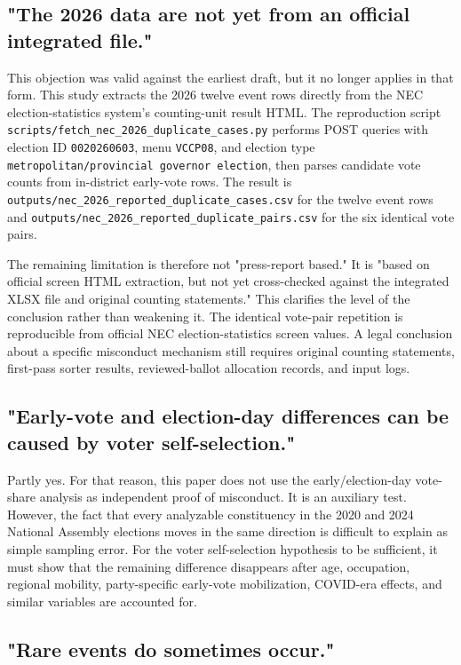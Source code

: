 \documentclass[preprint]{../ieie/IEIE}
\begin{document}
\subsection{"The 2026 data are not yet from an official integrated file."}

This objection was valid against the earliest draft, but it no longer applies in that form. This study extracts the 2026 twelve event rows directly from the NEC election-statistics system's counting-unit result HTML. The reproduction script \texttt{scripts/fetch\_nec\_2026\_duplicate\_cases.py} performs POST queries with election ID \texttt{0020260603}, menu \texttt{VCCP08}, and election type \texttt{metropolitan/provincial governor election}, then parses candidate vote counts from in-district early-vote rows. The result is \texttt{outputs/nec\_2026\_reported\_duplicate\_cases.csv} for the twelve event rows and \texttt{outputs/nec\_2026\_reported\_duplicate\_pairs.csv} for the six identical vote pairs.

The remaining limitation is therefore not "press-report based." It is "based on official screen HTML extraction, but not yet cross-checked against the integrated XLSX file and original counting statements." This clarifies the level of the conclusion rather than weakening it. The identical vote-pair repetition is reproducible from official NEC election-statistics screen values. A legal conclusion about a specific misconduct mechanism still requires original counting statements, first-pass sorter results, reviewed-ballot allocation records, and input logs.

\subsection{"Early-vote and election-day differences can be caused by voter self-selection."}

Partly yes. For that reason, this paper does not use the early/election-day vote-share analysis as independent proof of misconduct. It is an auxiliary test. However, the fact that every analyzable constituency in the 2020 and 2024 National Assembly elections moves in the same direction is difficult to explain as simple sampling error. For the voter self-selection hypothesis to be sufficient, it must show that the remaining difference disappears after age, occupation, regional mobility, party-specific early-vote mobilization, COVID-era effects, and similar variables are accounted for.

\subsection{"Rare events do sometimes occur."}
\end{document}
